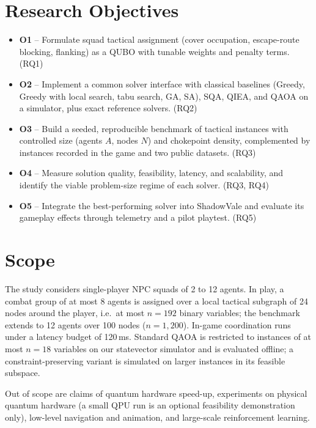\documentclass[12pt, a4paper]{article}
\begin{document}
\section*{Research Objectives}

\begin{itemize}
\item \textbf{O1} -- Formulate squad tactical assignment (cover occupation, escape-route blocking, flanking) as a QUBO with tunable weights and penalty terms. (RQ1)
\item \textbf{O2} -- Implement a common solver interface with classical baselines (Greedy, Greedy with local search, tabu search, GA, SA), SQA, QIEA, and QAOA on a simulator, plus exact reference solvers. (RQ2)
\item \textbf{O3} -- Build a seeded, reproducible benchmark of tactical instances with controlled size (agents $A$, nodes $N$) and chokepoint density, complemented by instances recorded in the game and two public datasets. (RQ3)
\item \textbf{O4} -- Measure solution quality, feasibility, latency, and scalability, and identify the viable problem-size regime of each solver. (RQ3, RQ4)
\item \textbf{O5} -- Integrate the best-performing solver into ShadowVale and evaluate its gameplay effects through telemetry and a pilot playtest. (RQ5)
\end{itemize}

\section*{Scope}

The study considers single-player NPC squads of 2 to 12 agents. In play, a combat group of at most 8 agents is assigned over a local tactical subgraph of 24 nodes around the player, i.e.\ at most $n = 192$ binary variables; the benchmark extends to 12 agents over 100 nodes ($n = 1{,}200$). In-game coordination runs under a latency budget of 120\,ms. Standard QAOA is restricted to instances of at most $n = 18$ variables on our statevector simulator and is evaluated offline; a constraint-preserving variant is simulated on larger instances in its feasible subspace.

Out of scope are claims of quantum hardware speed-up, experiments on physical quantum hardware (a small QPU run is an optional feasibility demonstration only), low-level navigation and animation, and large-scale reinforcement learning.
\end{document}
